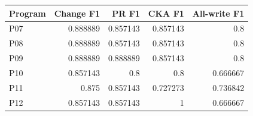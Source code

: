 \begin{center}\small
\begin{tabular}{@{}lrrrr@{}}
\toprule
Program & Change F1 & PR F1 & CKA F1 & All-write F1 \\
\midrule
P07 & 0.888889 & 0.857143 & 0.857143 & 0.8 \\
P08 & 0.888889 & 0.857143 & 0.857143 & 0.8 \\
P09 & 0.888889 & 0.888889 & 0.857143 & 0.8 \\
P10 & 0.857143 & 0.8 & 0.8 & 0.666667 \\
P11 & 0.875 & 0.857143 & 0.727273 & 0.736842 \\
P12 & 0.857143 & 0.857143 & 1 & 0.666667 \\
\bottomrule
\end{tabular}
\end{center}
